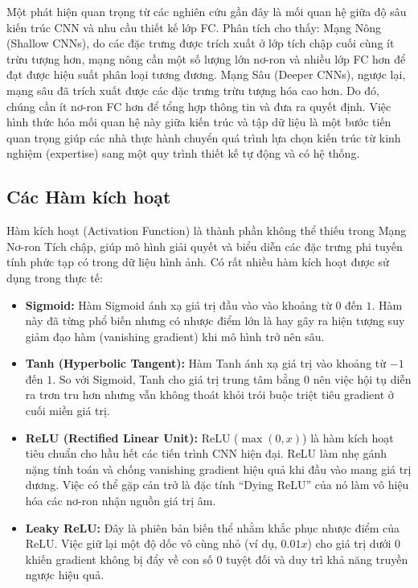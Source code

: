 Một phát hiện quan trọng từ các nghiên cứu gần đây là mối quan hệ giữa độ sâu kiến trúc CNN và nhu cầu thiết kế 
lớp FC. Phân tích cho thấy:
Mạng Nông (Shallow CNNs), do các đặc trưng được trích xuất ở lớp tích chập cuối cùng ít trừu tượng hơn, 
mạng nông cần một số lượng lớn nơ-ron và nhiều lớp FC hơn để đạt được hiệu suất phân loại tương đương.
Mạng Sâu (Deeper CNNs), ngược lại, mạng sâu đã trích xuất được các đặc trưng trừu tượng hóa cao hơn. 
Do đó, chúng cần ít nơ-ron FC hơn để tổng hợp thông tin và đưa ra quyết định.
Việc hình thức hóa mối quan hệ này giữa kiến trúc và tập dữ liệu là một bước tiến quan trọng giúp
các nhà thực hành chuyển quá trình lựa chọn kiến trúc từ kinh nghiệm (expertise) sang một quy trình 
thiết kế tự động và có hệ thống. \cite{Basha2020}

\subsection{Các Hàm kích hoạt}

Hàm kích hoạt (Activation Function) là thành phần không thể thiếu trong Mạng Nơ-ron Tích chập, giúp mô hình giải quyết và biểu diễn các đặc trưng phi tuyến tính phức tạp có trong dữ liệu hình ảnh. Có rất nhiều hàm kích hoạt được sử dụng trong thực tế:
\begin{itemize}
    \item \textbf{Sigmoid:} Hàm Sigmoid ánh xạ giá trị đầu vào vào khoảng từ $0$ đến $1$. Hàm này đã từng phổ biến nhưng có nhược điểm lớn là hay gây ra hiện tượng suy giảm đạo hàm (vanishing gradient) khi mô hình trở nên sâu.
    \item \textbf{Tanh (Hyperbolic Tangent):} Hàm Tanh ánh xạ giá trị vào khoảng từ $-1$ đến $1$. So với Sigmoid, Tanh cho giá trị trung tâm bằng $0$ nên việc hội tụ diễn ra trơn tru hơn nhưng vẫn không thoát khỏi trói buộc triệt tiêu gradient ở cuối miền giá trị.
    \item \textbf{ReLU (Rectified Linear Unit):} ReLU ($\max(0, x)$) \cite{Nair2010} là hàm kích hoạt tiêu chuẩn cho hầu hết các tiến trình CNN hiện đại. ReLU làm nhẹ gánh nặng tính toán và chống vanishing gradient hiệu quả khi đầu vào mang giá trị dương. Việc có thể gặp cản trở là đặc tính ``Dying ReLU'' của nó làm vô hiệu hóa các nơ-ron nhận nguồn giá trị âm.
    \item \textbf{Leaky ReLU:} Đây là phiên bản biến thể \cite{Maas2013} nhằm khắc phục nhược điểm của ReLU. Việc giữ lại một độ dốc vô cùng nhỏ (ví dụ, $0.01x$) cho giá trị dưới $0$ khiến gradient không bị đẩy về con số 0 tuyệt đối và duy trì khả năng truyền ngược hiệu quả.
\end{itemize}

